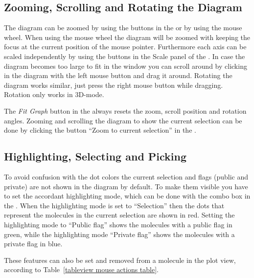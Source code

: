 \subsection{Zooming, Scrolling and Rotating the Diagram}

The diagram can be zoomed by using the buttons in the \tbar or by
using the mouse wheel. When using the mouse wheel the diagram will be
zoomed with keeping the focus at the current position of the mouse pointer.
Furthermore each axis can be scaled independently by using the buttons
in the Scale panel of the \sbar. In case the diagram becomes too
large to fit in the window you can scroll around by clicking in the
diagram with the left mouse button and drag it around. Rotating the
diagram works similar, just press the right mouse button while dragging.
Rotation only works in 3D-mode.

The \textit{Fit Graph} button in the \tbar always resets the zoom,
scroll position and rotation angles. Zooming and scrolling the diagram
to show the current selection can be done by clicking the button ``Zoom
to current selection'' in the \tbar.


\subsection{Highlighting, Selecting and Picking}

To avoid confusion with the dot colors the current selection and flags
(public and private) are not shown in the diagram by default. To make
them visible you have to set the accordant highlighting mode, which
can be done with the combo box in the \tbar. When the highlighting
mode is set to ``Selection'' then the dots that represent the
molecules in the current selection are shown in red. Setting the highlighting
mode to ``Public flag'' shows the molecules with a public flag
in green, while the highlighting mode ``Private flag'' shows the
molecules with a private flag in blue.

These features can also be set and removed from a molecule in the
plot view, according to Table~\ref{tableview mouse actions table}.

